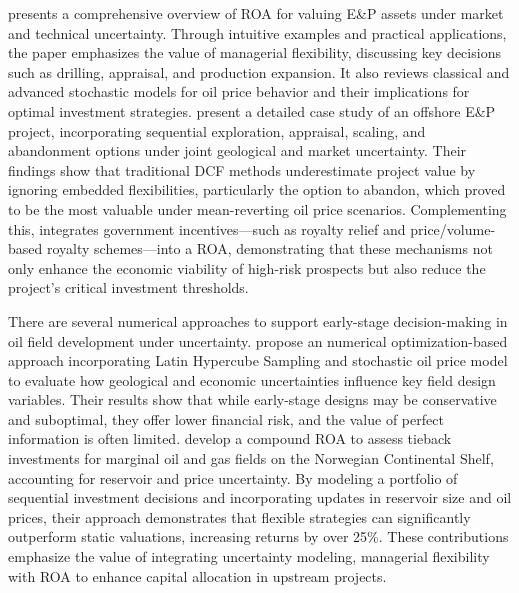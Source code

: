 \documentclass[pdflatex,sn-basic]{sn-jnl}%
\theoremstyle{thmstyleone}%
\theoremstyle{thmstyletwo}%
\theoremstyle{thmstylethree}%
\begin{document}
\cite{ref3} presents a comprehensive overview of ROA for valuing E\&P assets under market and technical uncertainty. Through intuitive examples and practical applications, the paper emphasizes the value of managerial flexibility, discussing key decisions such as drilling, appraisal, and production expansion. It also reviews classical and advanced stochastic models for oil price behavior and their implications for optimal investment strategies. \cite{ref4} present a detailed case study of an offshore E\&P project, incorporating sequential exploration, appraisal, scaling, and abandonment options under joint geological and market uncertainty. Their findings show that traditional DCF methods underestimate project value by ignoring embedded flexibilities, particularly the option to abandon, which proved to be the most valuable under mean-reverting oil price scenarios. Complementing this, \cite{ref5} integrates government incentives—such as royalty relief and price/volume-based royalty schemes—into a ROA, demonstrating that these mechanisms not only enhance the economic viability of high-risk prospects but also reduce the project's critical investment thresholds. 

There are several numerical approaches to support early-stage decision-making in oil field development under uncertainty. \cite{ref6} propose an numerical optimization-based approach incorporating Latin Hypercube Sampling and stochastic oil price model to evaluate how geological and economic uncertainties influence key field design variables. Their results show that while early-stage designs may be conservative and suboptimal, they offer lower financial risk, and the value of perfect information is often limited. \cite{ref7} develop a compound ROA to assess tieback investments for marginal oil and gas fields on the Norwegian Continental Shelf, accounting for reservoir and price uncertainty. By modeling a portfolio of sequential investment decisions and incorporating updates in reservoir size and oil prices, their approach demonstrates that flexible strategies can significantly outperform static valuations, increasing returns by over 25\%. These contributions emphasize the value of integrating uncertainty modeling, managerial flexibility with ROA to enhance capital allocation in upstream projects.
\end{document}
